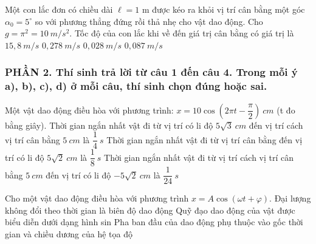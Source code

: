 	
	\begin{ex} %
		Một con lắc đơn có chiều dài $\ell = 1$ m được kéo ra khỏi vị trí cân bằng một góc $\alpha _0=5^\circ$ so với phương thẳng đứng rồi thả nhẹ cho vật dao động. Cho $g=\pi ^2=10\ m/s^2$. Tốc độ của con lắc khi về đến giá trị cân bằng có giá trị là
		\choice
		{$15,8\ m/s$}
		{\True $0,278\ m/s$}
		{$0,028\ m/s$}
		{$0,087\ m/s$}
		
	\end{ex}
	

\subsubsection*{PHẦN 2. Thí sinh trả lời từ câu 1 đến câu 4. Trong mỗi ý a), b), c), d) ở mỗi câu, thí sinh chọn đúng hoặc sai.}
\setcounter{ex}{0}
\begin{ex}
	Một vật dao động điều hòa với phương trình: $x=10 \cos \left(2 \pi t-\dfrac{\pi}{2}\right)\ cm$ (t đo bằng giây).
	{Thời gian ngắn nhất vật đi từ vị trí có li độ $5 \sqrt{3} \ cm$ đến vị trí cách vị trí cân bằng $5 \ cm$ là $\dfrac{1}{4} \ s$}
	{\True Thời gian ngắn nhất vật đi từ vị trí cân bằng đến vị trí có li độ $5 \sqrt{2} \ cm$ là $\dfrac{1}{8}\ s$}
	{\True Thời gian ngắn nhất vật đi từ vị trí cách vị trí cân bằng $5 \ cm$ đến vị trí có li độ $-5 \sqrt{2} \ cm$ là $\dfrac{1}{24} \ s$}
	
\end{ex}
\begin{ex}
	Cho một vật dao động điều hòa với phương trình $x=A\cos(\omega t+\varphi)$.
	{\True Đại lượng không đổi theo thời gian là biên độ dao động}
	{Quỹ đạo dao động của vật được biểu diễn dưới dạng hình sin}
	{\True Pha ban đầu của dao động phụ thuộc vào gốc thời gian và chiều dương của hệ tọa độ}
\end{ex} 

